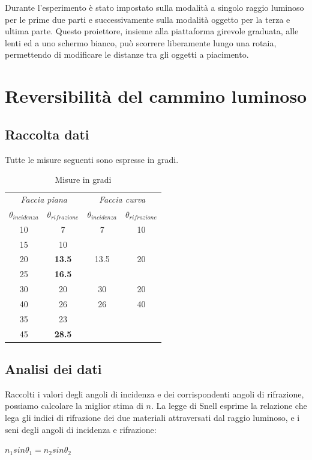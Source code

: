 \documentclass[a4paper,10pt]{report}
\begin{document}
Durante l'esperimento è stato impostato sulla modalità a singolo raggio luminoso per le prime due parti e successivamente sulla modalità oggetto per la terza e ultima parte. 
Questo proiettore, insieme alla piattaforma girevole graduata, alle lenti ed a uno schermo bianco, può scorrere liberamente lungo una rotaia, permettendo di modificare le distanze tra gli oggetti a piacimento.

\section{Reversibilità del cammino luminoso}
\subsection{Raccolta dati}
Tutte le misure seguenti sono espresse in gradi.


\begin{table}
\center
\begin{tabular}{c|c||c|c}
 \multicolumn{2}{c}{\textit{Faccia piana}} &
\multicolumn{2}{c}{\textit{Faccia curva}} \\
$\theta_{incidenza} $ & $\theta_{rifrazione} $ &$\theta_{incidenza} $ & $\theta_{rifrazione} $\\
\midrule
 10 & 7 & 7 & 10 \\
15 & 10 & &\\
20 & \textbf{13.5} & 13.5 & 20\\ 
25 & \textbf{16.5} & & \\
30 & 20 & 30 & 20\\
40 & 26 & 26 & 40\\
35 & 23 & &\\
45&  \textbf{28.5} & & \\
\end{tabular}
\caption*{Misure in gradi}
\end{table}

\subsection{Analisi dei dati}
Raccolti i valori degli angoli di incidenza e dei corrispondenti angoli di rifrazione, possiamo calcolare la miglior stima di $n$.
La legge di Snell esprime la relazione che lega gli indici di rifrazione dei due materiali attraversati dal raggio luminoso, e i seni degli angoli di incidenza e rifrazione:

\begin{center}
$n_1 sin\theta_1 = n_2 sin\theta_2$
\end{center}
\end{document}
